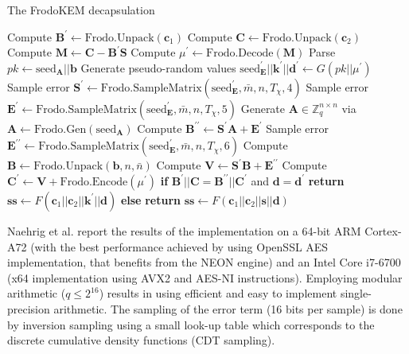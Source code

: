 \begin{algorithm}
\caption{The \textsf{FrodoKEM} decapsulation} \label{alg:decaps}
  \begin{algorithmic}[1]
        \State Compute $\mathbf{B}^\prime \leftarrow \text{Frodo.Unpack}(\mathbf{c}_1)$
        \State Compute $\mathbf{C} \leftarrow \text{Frodo.Unpack}(\mathbf{c}_2)$
        \State Compute $\mathbf{M} \leftarrow \mathbf{C} - \mathbf{B}^\prime \mathbf{S}$        
        \State Compute $\mu^\prime \leftarrow \text{Frodo.Decode}(\mathbf{M})$   
        \State Parse $pk \leftarrow \text{seed}_\mathbf{A} || \mathbf{b}$
        \State Generate pseudo-random values $\text{seed}^\prime_\mathbf{E} || \mathbf{k}^\prime ||\mathbf{d}^\prime \leftarrow G(pk || \mu^\prime)$       
       \State Sample error $\mathbf{S}^\prime \leftarrow \text{Frodo.SampleMatrix}(\text{seed}^\prime _\mathbf{E},\bar{m},n,T_\chi,4)$
       \State Sample error $\mathbf{E}^\prime \leftarrow \text{Frodo.SampleMatrix}(\text{seed}^\prime _\mathbf{E},\bar{m},n,T_\chi,5)$
        \State Generate $\mathbf{A} \in \mathbb{Z}^{n \times n}_{q}$ via $\mathbf{A} \leftarrow \text{Frodo.Gen}(\text{seed}_\mathbf{A})$
        \State Compute $\mathbf{B}^{\prime\prime} \leftarrow \mathbf{S}^\prime \mathbf{A} + \mathbf{E}^\prime$
        \State Sample error $\mathbf{E}^{\prime\prime} \leftarrow \text{Frodo.SampleMatrix}(\text{seed}^\prime_\mathbf{E},\bar{m},n,T_\chi,6    )$
        \State Compute $\mathbf{B} \leftarrow \text{Frodo.Unpack}(\mathbf{b},n,\bar{n})$
        \State Compute $\mathbf{V} \leftarrow \mathbf{S}^\prime \mathbf{B} + \mathbf{E}^{\prime\prime}$
        \State Compute $\mathbf{C}^\prime \leftarrow \mathbf{V} + \text{Frodo.Encode}(\mu^\prime)$
\State \textbf{if} $ \mathbf{B}^\prime || \mathbf{C} = \mathbf{B}^{\prime\prime} || \mathbf{C}^\prime$ and $\mathbf{d} = \mathbf{d}^\prime $ \textbf{return} $\mathbf{ss} \leftarrow F(\mathbf{c}_1 || \mathbf{c}_2 || \mathbf{k}^\prime || \mathbf{d})$
	 \State \textbf{else} \textbf{return} $\mathbf{ss} \leftarrow F(\mathbf{c}_1 || \mathbf{c}_2 || \mathbf{s} || \mathbf{d})$
    \EndProcedure
\end{algorithmic}
 \end{algorithm}

Naehrig et al. \cite{frodokem} report the results of the implementation on a 64-bit ARM Cortex-A72 (with the best performance achieved by using OpenSSL AES implementation, that benefits from the NEON engine) and an Intel Core i7-6700 (x64 implementation using AVX2 and AES-NI instructions). Employing modular arithmetic ($q \leq 2^{16}$) results in using efficient and easy to implement single-precision arithmetic. The sampling of the error term (16 bits per sample) is done by inversion sampling using a small look-up table which corresponds to the discrete cumulative density functions (CDT sampling).

